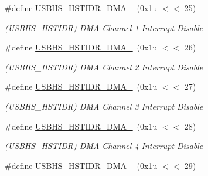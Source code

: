 \begin{DoxyCompactItemize}
\mbox{\label{group__SAMS70__USBHS_ga093461bf7b81f1b606d9362880f396f1}} 
\#define \mbox{\hyperlink{group__SAMS70__USBHS_ga093461bf7b81f1b606d9362880f396f1}{U\+S\+B\+H\+S\+\_\+\+H\+S\+T\+I\+D\+R\+\_\+\+D\+M\+A\+\_}}~(0x1u $<$$<$ 25)
\begin{DoxyCompactList}\small\item\em (U\+S\+B\+H\+S\+\_\+\+H\+S\+T\+I\+DR) D\+MA Channel 1 Interrupt Disable \end{DoxyCompactList}\item 
\mbox{\label{group__SAMS70__USBHS_ga918da75c8395361aa6433e3f7f0d698d}} 
\#define \mbox{\hyperlink{group__SAMS70__USBHS_ga918da75c8395361aa6433e3f7f0d698d}{U\+S\+B\+H\+S\+\_\+\+H\+S\+T\+I\+D\+R\+\_\+\+D\+M\+A\+\_}}~(0x1u $<$$<$ 26)
\begin{DoxyCompactList}\small\item\em (U\+S\+B\+H\+S\+\_\+\+H\+S\+T\+I\+DR) D\+MA Channel 2 Interrupt Disable \end{DoxyCompactList}\item 
\mbox{\label{group__SAMS70__USBHS_gac7209c9ffead11cc6099d64f2f2c902f}} 
\#define \mbox{\hyperlink{group__SAMS70__USBHS_gac7209c9ffead11cc6099d64f2f2c902f}{U\+S\+B\+H\+S\+\_\+\+H\+S\+T\+I\+D\+R\+\_\+\+D\+M\+A\+\_}}~(0x1u $<$$<$ 27)
\begin{DoxyCompactList}\small\item\em (U\+S\+B\+H\+S\+\_\+\+H\+S\+T\+I\+DR) D\+MA Channel 3 Interrupt Disable \end{DoxyCompactList}\item 
\mbox{\label{group__SAMS70__USBHS_ga2241db1c6d32aad6273c7ff2d74cb1bb}} 
\#define \mbox{\hyperlink{group__SAMS70__USBHS_ga2241db1c6d32aad6273c7ff2d74cb1bb}{U\+S\+B\+H\+S\+\_\+\+H\+S\+T\+I\+D\+R\+\_\+\+D\+M\+A\+\_}}~(0x1u $<$$<$ 28)
\begin{DoxyCompactList}\small\item\em (U\+S\+B\+H\+S\+\_\+\+H\+S\+T\+I\+DR) D\+MA Channel 4 Interrupt Disable \end{DoxyCompactList}\item 
\mbox{\label{group__SAMS70__USBHS_ga11082945215e5922c3f667372e20d570}} 
\#define \mbox{\hyperlink{group__SAMS70__USBHS_ga11082945215e5922c3f667372e20d570}{U\+S\+B\+H\+S\+\_\+\+H\+S\+T\+I\+D\+R\+\_\+\+D\+M\+A\+\_}}~(0x1u $<$$<$ 29)
$$
\end{DoxyCompactItemize}

